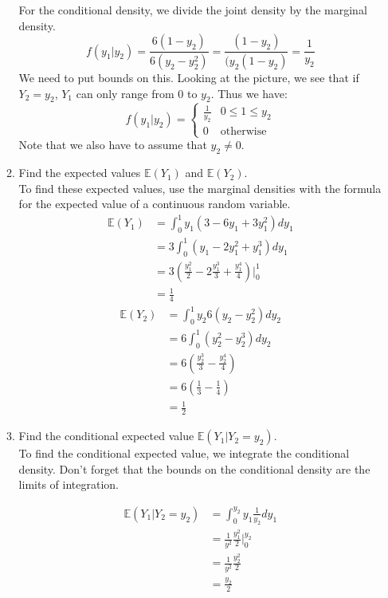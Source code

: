\documentclass[12pt]{article}
\def\E{{\mathbb E}}
\begin{document}
\begin{enumerate}
\begin{enumerate}
For the conditional density, we divide the joint density by the marginal density.
\[
f(y_1|y_2) = \frac{6(1 - y_2)}{6( y_2 - y_2^2) } = \frac{(1 - y_2)}{( y_2(1 - y_2) } = \frac{1}{y_2}
\]
We need to put bounds on this. Looking at the picture, we see that if $Y_2 = y_2$, $Y_1$ can only range from 0 to $y_2$. Thus we have:
\[
f(y_1|y_2) = \begin{cases}
\frac{1}{y_2} & 0 \leq 1 \leq y_2 \\
0 & \text{otherwise}
\end{cases}
\]
Note that we also have to assume that $y_2 \neq 0$.

\item Find the expected values $\E(Y_1)$ and $\E(Y_2)$.\\

To find these expected values, use the marginal densities with the formula for the expected value of a continuous random variable.
\begin{align*}
\E(Y_1) &= \int_0^1 y_1(3 - 6y_1 + 3 y_1^2) dy_1 \\
&= 3 \int_0^1 (y_1 - 2y_1^2 + y_1^3) dy_1 \\
&= 3 \left( \frac{y_1^2}{2} - 2 \frac{y_1^3}{3} + \frac{y_1^4}{4} \right)\Bigr|_0^1 \\
&= \frac{1}{4}
\end{align*}
\begin{align*}
\E(Y_2) &= \int_0^1 y_2 6( y_2 - y_2^2) dy_2 \\
&= 6 \int_0^1 (y_2^2 - y_2^3) dy_2 \\
&= 6 \left( \frac{y_2^3}{3} - \frac{y_2^4}{4} \right) \\
&= 6 \left( \frac{1}{3} - \frac{1}{4} \right) \\
&= \frac{1}{2}
\end{align*}

\item Find the conditional expected value $\E(Y_1 | Y_2 = y_2)$.\\

To find the conditional expected value, we integrate the conditional density. Don't forget that the bounds on the conditional density are the limits of integration.

\begin{align*}
\E(Y_1 | Y_2 = y_2) &= \int_0^{y_2} y_1 \frac{1}{y_2} dy_1 \\
&= \frac{1}{y^2} \frac{y_1^2}{2} \Bigr|_0^{y_2} \\\
&= \frac{1}{y^2} \frac{y_2^2}{2} \\
&= \frac{y_2}{2}
\end{align*}


\end{enumerate}
\end{enumerate}
\end{document}
